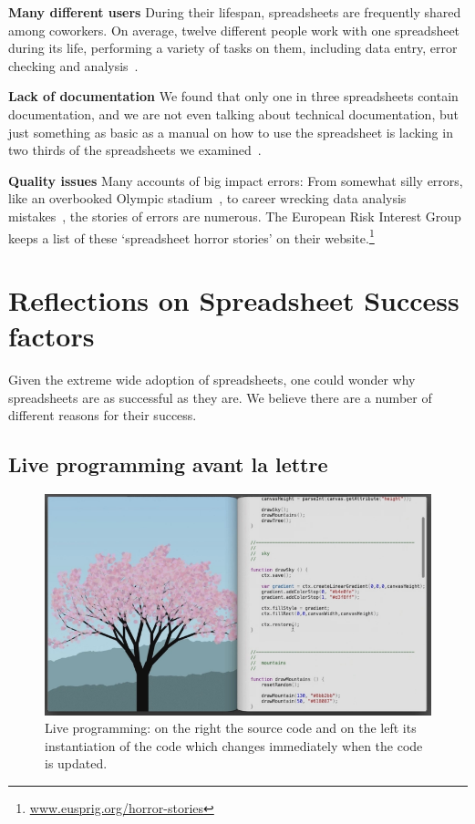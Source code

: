 \documentclass[conference]{IEEEtran}
\begin{document}
\textbf{Many different users} During their lifespan, spreadsheets are frequently shared among coworkers. On average, twelve different people work with one spreadsheet during its life, performing a variety of tasks on them, including data entry, error checking and analysis~\cite{hermans_supporting_2011}.

\textbf{Lack of documentation} We found that only one in three spreadsheets contain documentation, and we are not even talking about technical documentation, but just something as basic as a manual on how to use the spreadsheet is lacking in two thirds of the spreadsheets we examined~\cite{hermans_supporting_2011}.

\textbf{Quality issues} Many accounts of big impact errors: From somewhat silly errors, like an overbooked Olympic stadium~\cite{Kelso2012}, to career wrecking data analysis mistakes~\cite{Herndon2014}, the stories of errors are numerous. The European Risk Interest Group keeps a list of these ‘spreadsheet horror stories’ on their website.\footnote{\url{www.eusprig.org/horror-stories}}

\section{Reflections on Spreadsheet Success factors}
Given the extreme wide adoption of spreadsheets, one could wonder why spreadsheets are as successful as they are. We believe there are a number of different reasons for their success.

\subsection{Live programming avant la lettre}

\begin{figure}
  \begin{center}
  \includegraphics[width=\columnwidth]{fig/bret.png}
  \caption{Live programming: on the right the source code and on the left its instantiation of the code which changes immediately when the code is updated.}
  \label{fig:bret}
  \end{center}
\end{figure} 
\end{document}
